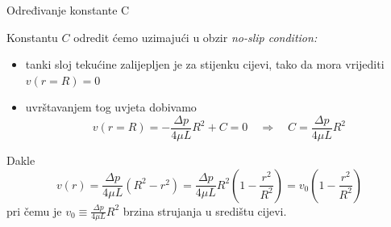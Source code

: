 \documentclass[croatian]{beamer}
\begin{document}
\begin{frame}{Određivanje konstante C}

Konstantu $C$ odredit ćemo uzimajući u obzir \emph{no-slip condition:}
\begin{itemize}
\item tanki sloj tekućine zalijepljen je za stijenku cijevi, tako da mora
vrijediti $v(r=R)=0$
\item uvrštavanjem tog uvjeta dobivamo
\[
v(r=R)=-\frac{\Delta p}{4\mu L}R^{2}+C=0\quad\Rightarrow\quad C=\frac{\Delta p}{4\mu L}R^{2}
\]
\end{itemize}
Dakle
\[
v(r)=\frac{\Delta p}{4\mu L}(R^{2}-r^{2})=\frac{\Delta p}{4\mu L}R^{2}\left(1-\frac{r^{2}}{R^{2}}\right)=v_{0}\left(1-\frac{r^{2}}{R^{2}}\right)
\]
pri čemu je $v_{0}\equiv\frac{\Delta p}{4\mu L}R^{2}$ brzina strujanja
u središtu cijevi.
\end{frame}
\end{document}
